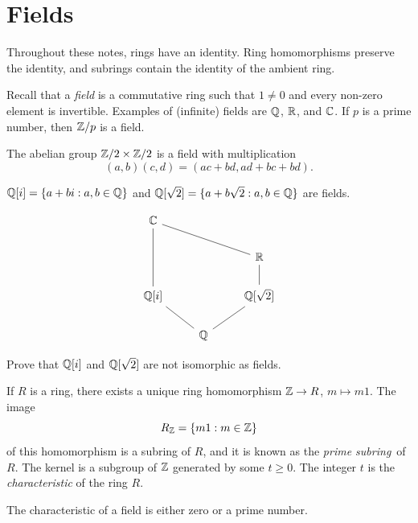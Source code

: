 \section{Fields}
\lecture

Throughout these notes, rings have an identity.
Ring homomorphisms preserve the identity, and subrings contain
the identity of the ambient ring.

Recall that a \emph{field} is a commutative
ring such that $1\ne 0$ and 
every non-zero element is invertible. Examples
of (infinite) fields are $\mathbb{Q}$, $\mathbb{R}$, and $\mathbb{C}$. If $p$
is a prime number, then $\mathbb{Z}/p$ is a field. 

\begin{example}
\label{exa:field_size4}
	The abelian group $\mathbb{Z}/2\times\mathbb{Z}/2$ is a field
	with multiplication
	\[
		(a,b)(c,d)=(ac+bd,ad+bc+bd).
	\]
\end{example}

\begin{example}
	$\mathbb{Q}[i]=\{a+bi:a,b\in\mathbb{Q}\}$ and 
	$\mathbb{Q}[\sqrt{2}]=\{a+b\sqrt{2}:a,b\in\mathbb{Q}\}$ are fields.
\end{example}

\[
\begin{tikzcd}
	{\mathbb{C}} \\
	&& {\mathbb{R}} \\
	{\mathbb{Q}[i]} && {\mathbb{Q}[\sqrt{2}]} \\
	& {\mathbb{Q}}
	\arrow[no head, from=3-3, to=4-2]
	\arrow[no head, from=2-3, to=3-3]
	\arrow[no head, from=1-1, to=3-1]
	\arrow[no head, from=3-1, to=4-2]
	\arrow[no head, from=1-1, to=2-3]
\end{tikzcd}
\]


\begin{exercise}
\label{xca:Q(i)}
Prove that $\mathbb{Q}[i]$ and $\mathbb{Q}[\sqrt{2}]$ are not isomorphic as fields.
\end{exercise}

If $R$ is a ring, there exists a unique ring homomorphism
$\mathbb{Z}\to R$, $m\mapsto m1$. The image 
\[
R_{\mathbb{Z}}=\{m1:m\in\mathbb{Z}\}
\]
of this homomorphism is a subring 
of $R$, and it is known as the \emph{prime subring}~of $R$. The
kernel is a subgroup of $\mathbb{Z}$ generated by
some $t\geq0$. The integer $t$ is 
the \emph{characteristic} of the ring $R$. 

\begin{exercise}
\label{xca: field characteristic}
The characteristic of a field is either zero or
a prime number. 
\end{exercise}

